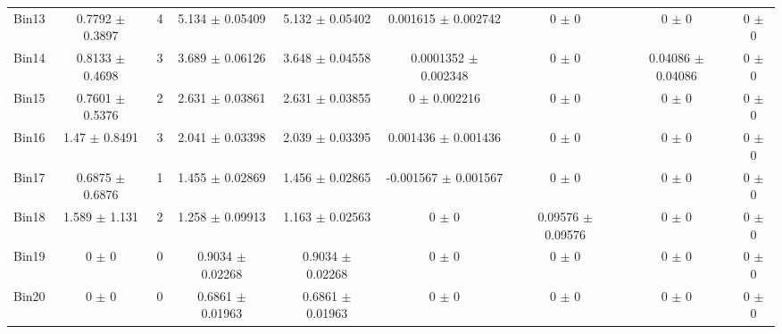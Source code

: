 \begin{tabular}{@{\extracolsep{4pt}}lcccccccc@{}}
     Bin13 & 0.7792 $\pm$ 0.3897 & 4 & 5.134 $\pm$ 0.05409 & 5.132 $\pm$ 0.05402 & 0.001615 $\pm$ 0.002742 & 0 $\pm$ 0 & 0 $\pm$ 0 & 0 $\pm$ 0 \\ 
     Bin14 & 0.8133 $\pm$ 0.4698 & 3 & 3.689 $\pm$ 0.06126 & 3.648 $\pm$ 0.04558 & 0.0001352 $\pm$ 0.002348 & 0 $\pm$ 0 & 0.04086 $\pm$ 0.04086 & 0 $\pm$ 0 \\ 
     Bin15 & 0.7601 $\pm$ 0.5376 & 2 & 2.631 $\pm$ 0.03861 & 2.631 $\pm$ 0.03855 & 0 $\pm$ 0.002216 & 0 $\pm$ 0 & 0 $\pm$ 0 & 0 $\pm$ 0 \\ 
     Bin16 & 1.47 $\pm$ 0.8491 & 3 & 2.041 $\pm$ 0.03398 & 2.039 $\pm$ 0.03395 & 0.001436 $\pm$ 0.001436 & 0 $\pm$ 0 & 0 $\pm$ 0 & 0 $\pm$ 0 \\ 
     Bin17 & 0.6875 $\pm$ 0.6876 & 1 & 1.455 $\pm$ 0.02869 & 1.456 $\pm$ 0.02865 & -0.001567 $\pm$ 0.001567 & 0 $\pm$ 0 & 0 $\pm$ 0 & 0 $\pm$ 0 \\ 
     Bin18 & 1.589 $\pm$ 1.131 & 2 & 1.258 $\pm$ 0.09913 & 1.163 $\pm$ 0.02563 & 0 $\pm$ 0 & 0.09576 $\pm$ 0.09576 & 0 $\pm$ 0 & 0 $\pm$ 0 \\ 
     Bin19 & 0 $\pm$ 0 & 0 & 0.9034 $\pm$ 0.02268 & 0.9034 $\pm$ 0.02268 & 0 $\pm$ 0 & 0 $\pm$ 0 & 0 $\pm$ 0 & 0 $\pm$ 0 \\ 
     Bin20 & 0 $\pm$ 0 & 0 & 0.6861 $\pm$ 0.01963 & 0.6861 $\pm$ 0.01963 & 0 $\pm$ 0 & 0 $\pm$ 0 & 0 $\pm$ 0 & 0 $\pm$ 0 \\ 
\hline\hline
  \end{tabular}
